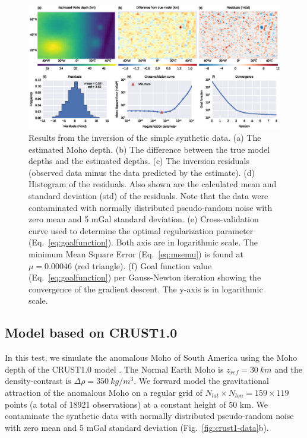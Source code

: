 \documentclass[extra]{gji}
\begin{document}
\begin{figure}
    \centering
    \includegraphics[width=\textwidth]{figures/synthetic-simple-results}
    \caption{
        Results from the inversion of the simple synthetic data.
        (a) The estimated Moho depth.
        (b) The difference between the true model depths
        and the estimated depths.
        (c) The inversion residuals (observed data minus
        the data predicted by the estimate).
        (d) Histogram of the residuals. Also shown are the calculated
        mean and standard deviation (std) of the residuals.
        Note that the data were contaminated with normally distributed
        pseudo-random noise with zero mean and 5 mGal standard deviation.
        (e) Cross-validation curve used to determine the optimal regularization
        parameter (Eq.~\ref{eq:goalfunction}).
        Both axis are in logarithmic scale.
        The minimum Mean Square Error (Eq.~\ref{eq:msemu}) is found at
        $\mu = 0.00046$ (red triangle).
        (f) Goal function value (Eq.~\ref{eq:goalfunction}) per Gauss-Newton
        iteration showing the convergence of the gradient descent.
        The y-axis is in logarithmic scale.
    }
    \label{fig:simple-results}
\end{figure}




\subsection{Model based on CRUST1.0}

In this test, we simulate the anomalous Moho of South America
using the Moho depth of the CRUST1.0 model
\citep[][ Fig.~\ref{fig:crust1-data}a]{laske2013}.
The Normal Earth Moho is $z_{ref} = 30\ km$ and
the density-contrast is $\Delta\rho = 350\ kg/m^3$.
We forward model the gravitational attraction of the anomalous Moho
on a regular grid of $N_{lat} \times N_{lon} = 159 \times 119$ points
(a total of 18921 observations) at a constant height of 50 km.
We contaminate the synthetic data with normally distributed pseudo-random noise
with zero mean and 5 mGal standard deviation (Fig.~\ref{fig:crust1-data}b).
\end{document}
